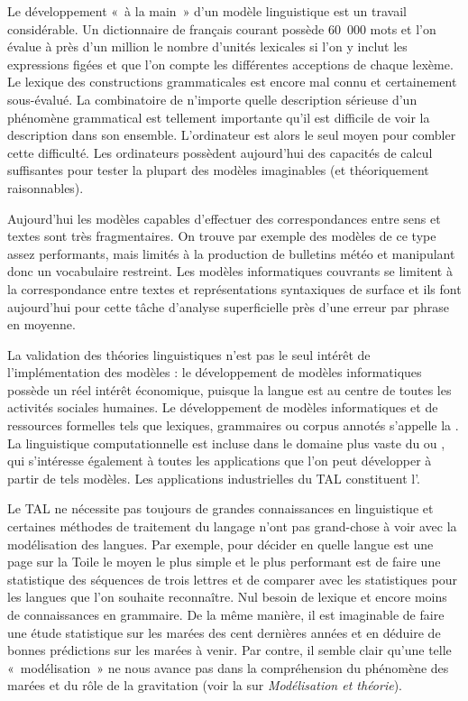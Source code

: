 Le développement «~à la main~» d’un modèle linguistique est un travail considérable. Un dictionnaire de français courant possède 60~000 mots et l’on évalue à près d’un million le nombre d’unités lexicales si l’on y inclut les expressions figées et que l’on compte les différentes acceptions de chaque lexème. Le lexique des constructions grammaticales est encore mal connu et certainement sous-évalué. La combinatoire de n’importe quelle description sérieuse d’un phénomène grammatical est tellement importante qu’il est difficile de voir la description dans son ensemble. L’ordinateur est alors le seul moyen pour combler cette difficulté. Les ordinateurs possèdent aujourd’hui des capacités de calcul suffisantes pour tester la plupart des modèles imaginables (et théoriquement raisonnables).

Aujourd’hui les modèles capables d’effectuer des correspondances entre sens et textes sont très fragmentaires. On trouve par exemple des modèles de ce type assez performants, mais limités à la production de bulletins météo et manipulant donc un vocabulaire restreint. Les modèles informatiques couvrants se limitent à la correspondance entre textes et représentations syntaxiques de surface et ils font aujourd’hui pour cette tâche d’analyse superficielle près d’une erreur par phrase en moyenne.

La validation des théories linguistiques n’est pas le seul intérêt de l’implémentation des modèles : le développement de modèles informatiques possède un réel intérêt économique, puisque la langue est au centre de toutes les activités sociales humaines. Le développement de modèles informatiques et de ressources formelles tels que lexiques, grammaires ou corpus annotés s’appelle la . La linguistique computationnelle est incluse dans le domaine plus vaste du  ou , qui s’intéresse également à toutes les applications que l’on peut développer à partir de tels modèles. Les applications industrielles du TAL constituent l’.

Le TAL ne nécessite pas toujours de grandes connaissances en linguistique et certaines méthodes de traitement du langage n’ont pas grand-chose à voir avec la modélisation des langues. Par exemple, pour décider en quelle langue est une page sur la Toile le moyen le plus simple et le plus performant est de faire une statistique des séquences de trois lettres et de comparer avec les statistiques pour les langues que l’on souhaite reconnaître. Nul besoin de lexique et encore moins de connaissances en grammaire. De la même manière, il est imaginable de faire une étude statistique sur les marées des cent dernières années et en déduire de bonnes prédictions sur les marées à venir. Par contre, il semble clair qu’une telle «~modélisation~» ne nous avance pas dans la compréhension du phénomène des marées et du rôle de la gravitation (voir la  sur \textit{Modélisation et théorie}).

